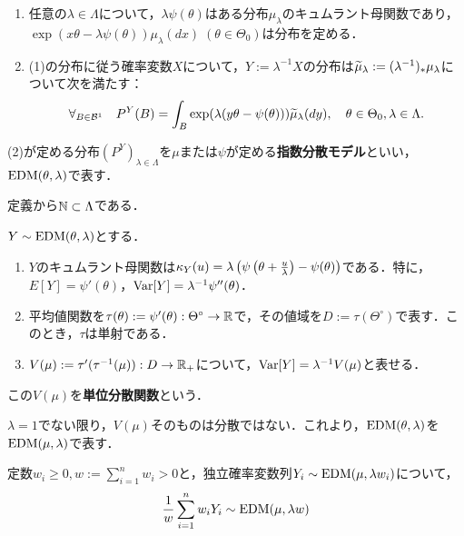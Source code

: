 \documentclass[uplatex,dvipdfmx]{jsreport}
\begin{document}
\begin{lemma}\mbox{}
    \begin{enumerate}
        \item 任意の$\lambda\in\Lambda$について，$\lambda\psi(\theta)$はある分布$\mu_\lambda$のキュムラント母関数であり，$\exp(x\theta-\lambda\psi(\theta))\mu_\lambda(dx)\;(\theta\in\Theta_0)$は分布を定める．
        \item (1)の分布に従う確率変数$X$について，$Y:=\lambda^{-1}X$の分布は$\widetilde{\mu}_\lambda:=(\lambda^{-1})_*\mu_\lambda$について次を満たす：
        \[\forall_{B\in\mathcal{B}^1}\quad P^Y(B)=\int_B\exp(\lambda(y\theta-\psi(\theta)))\widetilde{\mu}_\lambda(dy),\quad\theta\in\Theta_0,\lambda\in\Lambda.\]
    \end{enumerate}
    (2)が定める分布$(P^Y)_{\lambda\in\Lambda}$を$\mu$または$\psi$が定める\textbf{指数分散モデル}といい，$\mathrm{EDM}(\theta,\lambda)$で表す．
\end{lemma}

\begin{remark}
    定義から$\mathbb{N}\subset\Lambda$である．
\end{remark}

\begin{lemma}
    $Y\sim\mathrm{EDM}(\theta,\lambda)$とする．
    \begin{enumerate}
        \item $Y$のキュムラント母関数は$\kappa_Y(u)=\lambda\left(\psi\left(\theta+\frac{u}{\lambda}\right)-\psi(\theta)\right)$である．特に，$E[Y]=\psi'(\theta)$，$\mathrm{Var}[Y]=\lambda^{-1}\psi''(\theta)$．
        \item 平均値関数を$\tau(\theta):=\psi'(\theta):\Theta^\circ\to\mathbb{R}$で，その値域を$D:=\tau(\Theta^\circ)$で表す．このとき，$\tau$は単射である．
        \item $V(\mu):=\tau'(\tau^{-1}(\mu)):D\to\mathbb{R}_+$について，$\mathrm{Var}[Y]=\lambda^{-1}V(\mu)$と表せる．
    \end{enumerate}
    この$V(\mu)$を\textbf{単位分散関数}という．
\end{lemma}
\begin{remark}
    $\lambda=1$でない限り，$V(\mu)$そのものは分散ではない．これより，$\mathrm{EDM}(\theta,\lambda)$を$\mathrm{EDM}(\mu,\lambda)$で表す．
\end{remark}

\begin{lemma}
    定数$w_i\ge0,w:=\sum^n_{i=1}w_i>0$と，独立確率変数列$Y_i\sim\mathrm{EDM}(\mu,\lambda w_i)$について，
    \[\frac{1}{w}\sum^n_{i=1}w_iY_i\sim\mathrm{EDM}(\mu,\lambda w)\]
\end{lemma}
\end{document}
